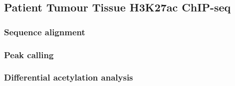 \subsection{Patient Tumour Tissue H3K27ac ChIP-seq}


\subsubsection{Sequence alignment}


\subsubsection{Peak calling}


\subsubsection{Differential acetylation analysis}

